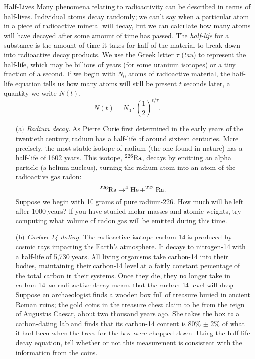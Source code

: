 \documentclass[12pt]{article}
\begin{document}
\begin{probdesc}{7}{Half-Lives}
Many phenomena relating to radioactivity can be described in terms of
half-lives.  Individual atoms decay randomly; we can't say when a
particular atom in a piece of radioactive mineral will decay, but we
can calculate how many atoms will have decayed after some amount of
time has passed.  The {\em half-life} for a substance is the amount of
time it takes for half of the material to break down into radioactive
decay products.  We use the Greek letter $\tau$ ({\em tau}) to
represent the half-life, which may be billions of years (for some
uranium isotopes) or a tiny fraction of a second.  If we begin with
$N_0$ atoms of radioactive material, the half-life equation tells us
how many atoms will still be present $t$ seconds later, a quantity we
write $N(t)$.
\begin{equation}
N(t) = N_0 \cdot \left(\frac{1}{2}\right)^{t / \tau}.
\end{equation}

\begin{enumerate}
\item[(a)] {\em Radium decay.}  As Pierre Curie first determined in
  the early years of the twentieth century, radium has a half-life of
  around sixteen centuries.  More precisely, the most stable isotope
  of radium (the one found in nature) has a half-life of 1602 years.
  This isotope, $^{226}{\rm Ra}$, decays by emitting an alpha particle (a
  helium nucleus), turning the radium atom into an atom of the
  radioactive gas radon:
  \begin{equation}
    ^{226}{\rm Ra} \rightarrow ^4{\rm He} + ^{222}{\rm Rn}.
  \end{equation}
  Suppose we begin with 10 grams of pure radium-226.  How much will be
  left after 1000 years?  If you have studied molar masses and atomic
  weights, try computing what volume of radon gas will be emitted
  during this time.

\item[(b)] {\em Carbon-14 dating.} The radioactive isotope carbon-14
  is produced by cosmic rays impacting the Earth's atmosphere.  It
  decays to nitrogen-14 with a half-life of 5,730 years.  All living
  organisms take carbon-14 into their bodies, maintaining their
  carbon-14 level at a fairly constant percentage of the total carbon
  in their systems.  Once they die, they no longer take in carbon-14,
  so radioactive decay means that the carbon-14 level will drop.
  Suppose an archaeologist finds a wooden box full of treasure buried
  in ancient Roman ruins; the gold coins in the treasure chest claim
  to be from the reign of Augustus Caesar, about two thousand years
  ago.  She takes the box to a carbon-dating lab and finds that its
  carbon-14 content is 80\% $\pm$ 2\% of what it had been when the
  trees for the box were chopped down.  Using the half-life decay
  equation, tell whether or not this measurement is consistent with
  the information from the coins.


\end{enumerate}
\end{probdesc}
\end{document}
